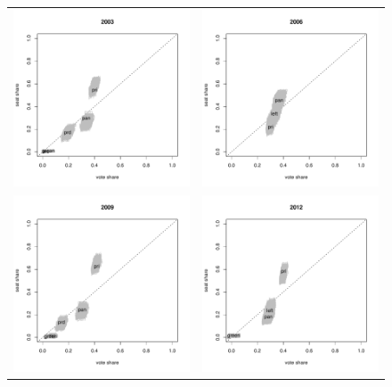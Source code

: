\documentclass[letter,12pt]{article}
\begin{document}
\begin{figure}
\begin{center}
\begin{tabular}{cc}
    \includegraphics[width=.4\columnwidth]{vs2003.pdf} &
    \includegraphics[width=.4\columnwidth]{vs2006.pdf} \\
    \includegraphics[width=.4\columnwidth]{vs2009.pdf} &
    \includegraphics[width=.4\columnwidth]{vs2012.pdf} \\

\end{tabular}
\end{center}
\end{figure}
\end{document}
